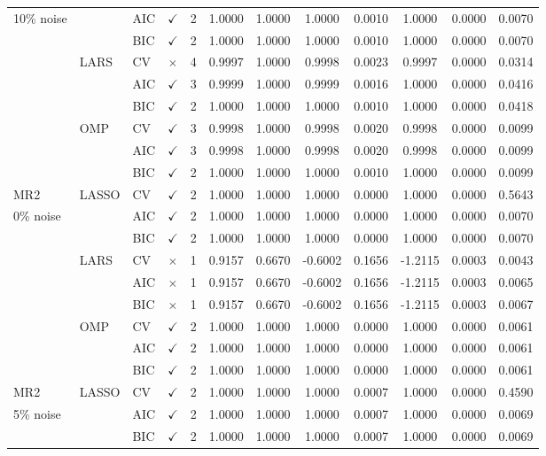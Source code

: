\documentclass[11pt,a4paper]{article}
\begin{document}
{\begin{longtable}{@{}lllccccccccc@{}}
10\% noise & & AIC & $\checkmark$ & 2 & 1.0000 & 1.0000 & 1.0000 & 0.0010 & 1.0000 & 0.0000 & 0.0070 \\
& & BIC & $\checkmark$ & 2 & 1.0000 & 1.0000 & 1.0000 & 0.0010 & 1.0000 & 0.0000 & 0.0070 \\
& LARS & CV & $\times$ & 4 & 0.9997 & 1.0000 & 0.9998 & 0.0023 & 0.9997 & 0.0000 & 0.0314 \\
& & AIC & $\checkmark$ & 3 & 0.9999 & 1.0000 & 0.9999 & 0.0016 & 1.0000 & 0.0000 & 0.0416 \\
& & BIC & $\checkmark$ & 2 & 1.0000 & 1.0000 & 1.0000 & 0.0010 & 1.0000 & 0.0000 & 0.0418 \\
& OMP & CV & $\checkmark$ & 3 & 0.9998 & 1.0000 & 0.9998 & 0.0020 & 0.9998 & 0.0000 & 0.0099 \\
& & AIC & $\checkmark$ & 3 & 0.9998 & 1.0000 & 0.9998 & 0.0020 & 0.9998 & 0.0000 & 0.0099 \\
& & BIC & $\checkmark$ & 2 & 1.0000 & 1.0000 & 1.0000 & 0.0010 & 1.0000 & 0.0000 & 0.0099 \\ \midrule
MR2 & LASSO & CV & $\checkmark$ & 2 & 1.0000 & 1.0000 & 1.0000 & 0.0000 & 1.0000 & 0.0000 & 0.5643 \\
0\% noise & & AIC & $\checkmark$ & 2 & 1.0000 & 1.0000 & 1.0000 & 0.0000 & 1.0000 & 0.0000 & 0.0070 \\
& & BIC & $\checkmark$ & 2 & 1.0000 & 1.0000 & 1.0000 & 0.0000 & 1.0000 & 0.0000 & 0.0070 \\
& LARS & CV & $\times$ & 1 & 0.9157 & 0.6670 & -0.6002 & 0.1656 & -1.2115 & 0.0003 & 0.0043 \\
& & AIC & $\times$ & 1 & 0.9157 & 0.6670 & -0.6002 & 0.1656 & -1.2115 & 0.0003 & 0.0065 \\
& & BIC & $\times$ & 1 & 0.9157 & 0.6670 & -0.6002 & 0.1656 & -1.2115 & 0.0003 & 0.0067 \\
& OMP & CV & $\checkmark$ & 2 & 1.0000 & 1.0000 & 1.0000 & 0.0000 & 1.0000 & 0.0000 & 0.0061 \\
& & AIC & $\checkmark$ & 2 & 1.0000 & 1.0000 & 1.0000 & 0.0000 & 1.0000 & 0.0000 & 0.0061 \\
& & BIC & $\checkmark$ & 2 & 1.0000 & 1.0000 & 1.0000 & 0.0000 & 1.0000 & 0.0000 & 0.0061 \\ \midrule
MR2 & LASSO & CV & $\checkmark$ & 2 & 1.0000 & 1.0000 & 1.0000 & 0.0007 & 1.0000 & 0.0000 & 0.4590 \\
5\% noise & & AIC & $\checkmark$ & 2 & 1.0000 & 1.0000 & 1.0000 & 0.0007 & 1.0000 & 0.0000 & 0.0069 \\
& & BIC & $\checkmark$ & 2 & 1.0000 & 1.0000 & 1.0000 & 0.0007 & 1.0000 & 0.0000 & 0.0069 \\

\end{longtable}}
\end{document}
